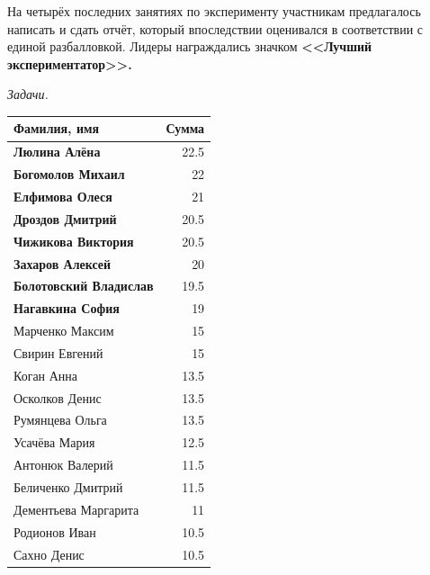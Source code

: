 \documentclass[12pt]{article}
\newlength{\h}
\newlength{\x}
\begin{document}
На четырёх последних занятиях по эксперименту участникам предлагалось
написать и сдать отчёт, который впоследствии оценивался в соответствии
с единой разбалловкой. Лидеры награждались значком \textbf{<<Лучший
  экспериментатор>>.}

\begin{table}[ht]
  \begin{minipage}[t]{0.48\linewidth}\centering
    \begin{center}
      \textit{Задачи.}
    \end{center}
    \begin{tabular}{|l|r|}
      \hline
      Фамилия, имя           &  Сумма  \\
      \hline
      \textbf{Люлина Алёна}           &   22.5  \\
      \hline
      \textbf{Богомолов Михаил}       &     22  \\
      \hline
      \textbf{Елфимова Олеся}         &     21  \\
      \hline
      \textbf{Дроздов Дмитрий}        &   20.5  \\
      \hline
      \textbf{Чижикова Виктория}      &   20.5  \\
      \hline
      \textbf{Захаров Алексей}        &     20  \\
      \hline
      \textbf{Болотовский Владислав}  &   19.5  \\
      \hline
      \textbf{Нагавкина София}        &     19  \\
      \hline
      Марченко Максим        &     15  \\
      \hline
      Свирин Евгений         &    15  \\
      \hline
      Коган Анна             &   13.5  \\
      \hline
      Осколков Денис         &   13.5  \\
      \hline
      Румянцева Ольга        &   13.5  \\
      \hline
      Усачёва Мария          &   12.5  \\
      \hline
      Антонюк Валерий        &   11.5  \\
      \hline
      Беличенко Дмитрий      &   11.5  \\
      \hline
      Дементьева Маргарита   &     11  \\
      \hline
      Родионов Иван          &   10.5  \\
      \hline
      Сахно Денис            &   10.5  \\
      \hline

\end{tabular}
\end{minipage}
\end{table}
\end{document}
